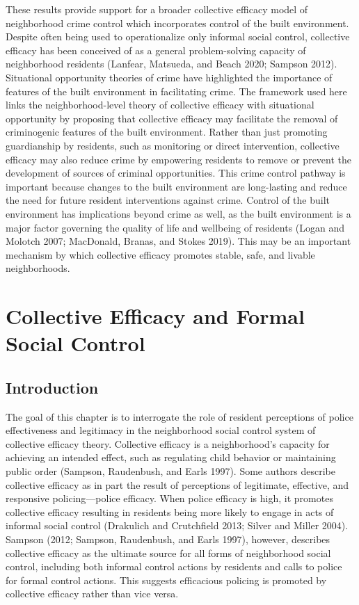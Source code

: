 \documentclass [11pt, proquest] {uwthesis}[2015/03/03]
\begin{document}
These results provide support for a broader collective efficacy model of neighborhood crime control which incorporates control of the built environment. Despite often being used to operationalize only informal social control, collective efficacy has been conceived of as a general problem-solving capacity of neighborhood residents (Lanfear, Matsueda, and Beach 2020; Sampson 2012). Situational opportunity theories of crime have highlighted the importance of features of the built environment in facilitating crime. The framework used here links the neighborhood-level theory of collective efficacy with situational opportunity by proposing that collective efficacy may facilitate the removal of criminogenic features of the built environment. Rather than just promoting guardianship by residents, such as monitoring or direct intervention, collective efficacy may also reduce crime by empowering residents to remove or prevent the development of sources of criminal opportunities. This crime control pathway is important because changes to the built environment are long-lasting and reduce the need for future resident interventions against crime. Control of the built environment has implications beyond crime as well, as the built environment is a major factor governing the quality of life and wellbeing of residents (Logan and Molotch 2007; MacDonald, Branas, and Stokes 2019). This may be an important mechanism by which collective efficacy promotes stable, safe, and livable neighborhoods.

\hypertarget{formalcontrol}{%
\chapter{Collective Efficacy and Formal Social Control}\label{formalcontrol}}

\hypertarget{introduction-2}{%
\section{Introduction}\label{introduction-2}}

The goal of this chapter is to interrogate the role of resident perceptions of police effectiveness and legitimacy in the neighborhood social control system of collective efficacy theory. Collective efficacy is a neighborhood's capacity for achieving an intended effect, such as regulating child behavior or maintaining public order (Sampson, Raudenbush, and Earls 1997). Some authors describe collective efficacy as in part the result of perceptions of legitimate, effective, and responsive policing---police efficacy. When police efficacy is high, it promotes collective efficacy resulting in residents being more likely to engage in acts of informal social control (Drakulich and Crutchfield 2013; Silver and Miller 2004). Sampson (2012; Sampson, Raudenbush, and Earls 1997), however, describes collective efficacy as the ultimate source for all forms of neighborhood social control, including both informal control actions by residents and calls to police for formal control actions. This suggests efficacious policing is promoted by collective efficacy rather than vice versa.
\end{document}
